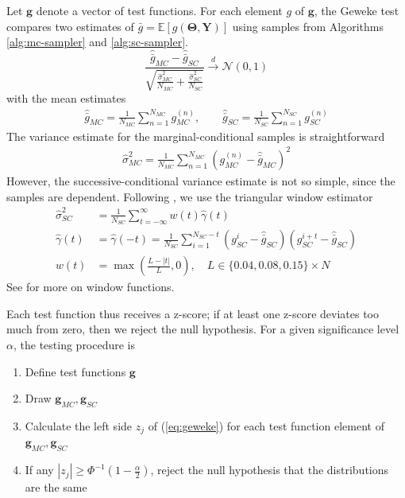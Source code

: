 \documentclass[a4paper,11pt]{article}
\newcommand{\E}{\mathbb{E}}
\begin{document}
Let $\mathbf{g}$ denote a vector of test functions. For each element $g$ of $\mathbf{g}$, the Geweke test compares two estimates of $\bar{g} = \E[g(\mathbf{\Theta}, \mathbf{Y})]$ using samples from Algorithms \ref{alg:mc-sampler} and \ref{alg:sc-sampler}.
\begin{equation}
    \frac{\hat{\bar{g}}_{MC} - \hat{\bar{g}}_{SC}}{\sqrt{ \frac{\hat{\sigma}^{2}_{MC}}{N_{MC}} + \frac{\hat{\sigma}^{2}_{SC}}{N_{SC}}}} \xrightarrow[]{d} \mathcal{N}(0, 1)
    \label{eq:geweke}
\end{equation}
with the mean estimates
\begin{align*}
    \hat{\bar{g}}_{MC} = \frac{1}{N_{MC}}\sum_{n=1}^{N_{MC}}g_{MC}^{(n)}, \qquad \hat{\bar{g}}_{SC} = \frac{1}{N_{SC}}\sum_{n=1}^{N_{SC}}g_{SC}^{(n)}
\end{align*}
The variance estimate for the marginal-conditional samples is straightforward
\begin{align*}
    \hat{\sigma}_{MC}^{2} = \frac{1}{N_{MC}}\sum_{n=1}^{N_{MC}}(g_{MC}^{(n)} - \hat{\bar{g}}_{MC})^{2}
\end{align*}
However, the successive-conditional variance estimate is not so simple, since the samples are dependent. Following \cite{geweke_using_1999}, we use the triangular window estimator
\begin{align*}
    \hat{\sigma}_{SC}^{2} &= \frac{1}{N_{SC}}\sum_{t=-\infty}^{\infty} w(t) \hat{\gamma}(t) \\
    \hat{\gamma}(t) &= \hat{\gamma}(-t) = \frac{1}{N_{SC}}\sum_{i=1}^{N_{SC}-t}(g_{SC}^{i} - \hat{\bar{g}}_{SC})(g_{SC}^{i+t} - \hat{\bar{g}}_{SC}) \\
    w(t) &= \max{\left(\frac{L-|t|}{L}, 0\right)}, \quad L \in \{0.04, 0.08, 0.15\} \times N
\end{align*}
See \cite{priestley_spectral_1981} for more on window functions.

Each test function thus receives a z-score; if at least one z-score deviates too much from zero, then we reject the null hypothesis. For a given significance level $\alpha$, the testing procedure is
\begin{enumerate}
    \item Define test functions $\mathbf{g}$
    \item Draw $\mathbf{g}_{MC}, \mathbf{g}_{SC}$
    \item Calculate the left side $z_{j}$ of (\ref{eq:geweke}) for each test function element of $\mathbf{g}_{MC}, \mathbf{g}_{SC}$
    \item If any $|z_{j}| \geq \Phi^{-1}(1-\frac{\alpha}{2})$, reject the null hypothesis that the distributions are the same
\end{enumerate}
\end{document}
